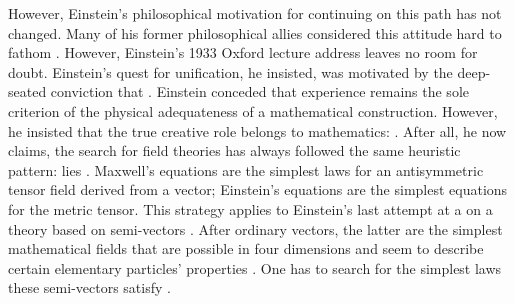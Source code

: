 \documentclass[final]{article}
\begin{document}
However, Einstein's philosophical motivation for continuing on this path has not changed. Many of his former philosophical allies considered this attitude hard to fathom \citep[215f.]{Frank1947}. However, Einstein's 1933 Oxford lecture address leaves no room for doubt. Einstein's quest for unification, he insisted, was motivated by the deep-seated conviction that  \citep{Einstein1933}. Einstein conceded that experience remains the sole criterion of the physical adequateness of a mathematical construction. However, he insisted that the true creative role belongs to mathematics:  \citep[167]{Einstein1933}. After all, he now claims, the search for field theories has always followed the same heuristic pattern:  lies  \citep[168]{Einstein1933}. Maxwell's equations are the simplest laws for an antisymmetric tensor field derived from a vector; Einstein's equations are the simplest equations for the metric tensor\etc. This strategy applies to Einstein's last attempt at a \uft on a theory based on semi-vectors \citep{Einstein1932c,Einstein1933c,Einstein1934b,Einstein1933d}. After ordinary vectors, the latter are the simplest mathematical fields that are possible in four dimensions and seem to describe certain elementary particles' properties \citep{Dongen2004}. One has to search for the simplest laws these semi-vectors satisfy \citep[168]{Einstein1933}.
\end{document}
